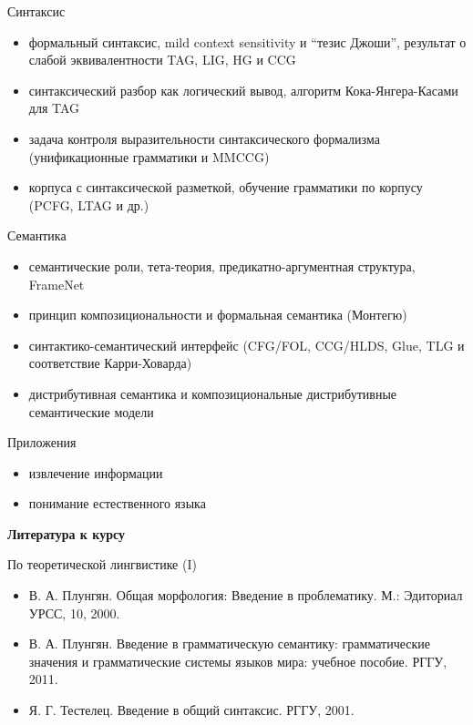 \documentclass{beamer}
\begin{document}
\begin{frame}{Синтаксис}
\begin{itemize}
	\item формальный синтаксис, mild context sensitivity и ``тезис Джоши'', результат о слабой эквивалентности TAG, LIG, HG и CCG
	\item синтаксический разбор как логический вывод, алгоритм Кока-Янгера-Касами для TAG
	\item задача контроля выразительности синтаксического формализма (унификационные  грамматики и MMCCG)
	\item корпуса с синтаксической разметкой, обучение грамматики по корпусу (PCFG, LTAG и др.)
\end{itemize}
\end{frame}

\begin{frame}{Семантика}
\begin{itemize}
	\item семантические роли, тета-теория, предикатно-аргументная структура, FrameNet
	\item принцип композициональности и формальная семантика (Монтегю)
	\item синтактико-семантический интерфейс (CFG/FOL, CCG/HLDS, Glue, TLG и соответствие Карри-Ховарда)
	\item дистрибутивная семантика и композициональные дистрибутивные семантические модели
\end{itemize}
\end{frame}

\begin{frame}{Приложения}
\begin{itemize}
	\item извлечение информации
	\item понимание естественного языка
\end{itemize}
\end{frame}



\begin{frame}{}
\begin{center}
	\textbf{Литература к курсу}
\end{center}
\end{frame}

\begin{frame}{По теоретической лингвистике (I)}
\begin{itemize}
	\item В. А. Плунгян. Общая морфология: Введение в проблематику. М.: Эдиториал УРСС, 10, 2000.
	\medskip
	\item В. А. Плунгян. Введение в грамматическую семантику: грамматические значения и грамматические системы языков мира: учебное пособие. РГГУ, 2011.
	\medskip
	\item Я. Г. Тестелец. Введение в общий синтаксис. РГГУ, 2001.
\end{itemize}
\end{frame}
\end{document}

